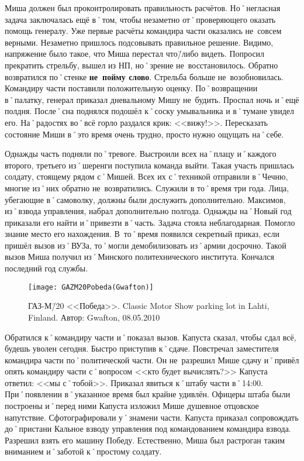 Миша должен был проконтролировать правильность расчётов. Но˚негласная задача заключалась ещё в˚том, чтобы незаметно от˚проверяющего оказать помощь генералу. Уже первые расчёты командира части оказались не~совсем верными. Незаметно пришлось подсовывать правильное решение. Видимо, напряжение было такое, что Миша перестал что\=/либо видеть. Попросил прекратить стрельбу, вышел из НП, но˚зрение не~восстановилось. Обратно возвратился по˚стенке \textbf{не~пойму слово}. Стрельба больше не~возобновилась. Командиру части поставили положительную оценку. По˚возвращении в˚палатку, генерал приказал дневальному Мишу не~будить. Проспал ночь и˚ещё полдня. После˚сна поднялся подошёл к˚соску умывальника и в˚тумане увидел его. На˚радостях во˚всё горло раздался крик: <<вижу!>>. Пересказать состояние Миши в˚это время очень трудно, просто нужно ощущать на˚себе.

Однажды часть подняли по˚тревоге. Выстроили всех на˚плацу и˚каждого второго, третьего из˚шеренги поступила команда выйти. Такая участь пришлась солдату, стоящему рядом с˚Мишей. Всех их с˚техникой отправили в˚Чечню, многие из˚них обратно не~возвратились. Служили в то˚время три года. Лица, убегающие в˚самоволку, должны были дослужить дополнительно. Максимов, из˚взвода управления, набрал дополнительно полгода. Однажды на˚Новый год приказали его найти и˚привезти в˚часть. Задача стояла неблагодарная. Помогло знание место его нахождения. В~то˚время появился секретный приказ, если пришёл вызов из˚ВУЗа, то˚могли демобилизовать из˚армии досрочно. Такой вызов Миша получил из˚Минского политехнического института. Кончался последний год службы.

\begin{wrapfigure}{O}{.4\textwidth}
\centering
\texttt{[image: GAZM20Pobeda(Gwafton)]}
\caption{ГАЗ-М\=/20 <<Победа>>. Classic Motor Show parking lot in Lahti, Finland. Автор: Gwafton, 08.05.2010}
\label{fig:GAZM20Pobeda(Gwafton)}
\end{wrapfigure}

Обратился к˚командиру части и˚показал вызов. Капуста сказал, чтобы сдал всё, будешь уволен сегодня. Быстро приступив к˚сдаче. Повстречал заместителя командира части по˚политической части. Он не~разрешил Мише сдачу и˚привёл опять командиру части с˚вопросом <<кто будет вычислять?>> Капуста ответил: <<мы с˚тобой>>. Приказал явиться к˚штабу части в˚14:00. При˚появлении в˚указанное время был крайне удивлён. Офицеры штаба были построены и˚перед ними Капуста изложил Мише душевное отцовское напутствие. Сфотографировали у˚знамени части. Капуста приказал сопровождать до˚пристани Кальное взводу управления под командованием командира взвода. Разрешил взять его машину Победу. Естественно, Миша был растроган таким вниманием и˚заботой к˚простому солдату. 

